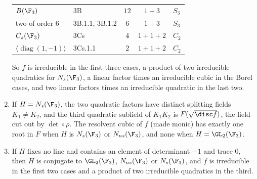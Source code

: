 \begin{proposition}
\begin{enumerate}[label=(\alph*)]
\begin{center}
\begin{tabular}{llccl}
$B(\F_3)$ & 3B & $12$ & $1+3$ & $S_3$\\
two of order $6$ & 3B.1.1, 3B.1.2 & $6$ & $1+3$ & $S_3$\\
$C_s(\F_3)$ & 3Cs & $4$ & $1+1+2$ & $C_2$\\
$\langle\operatorname{diag}(1,-1)\rangle$ & 3Cs.1.1 & $2$ & $1+1+2$ & $C_2$\\
\bottomrule
\end{tabular}
\end{center}
So $f$ is irreducible in the first three cases, a product of two irreducible quadratics for $N_s(\F_3)$, a linear factor times an irreducible cubic in the
Borel cases, and two linear factors times an irreducible quadratic in the last two.
\item If $H=N_s(\F_3)$, the two quadratic factors have distinct splitting fields $K_1\ne K_2$, and the third quadratic subfield of $K_1K_2$ is $F(\sqrt{\disc f})$, the
field cut out by $\det\circ\rho$. The resolvent cubic of $f$ (made monic) has exactly one root in $F$ when $H$ is $N_s(\F_3)$ or $N_{ns}(\F_3)$, and none when
$H=\GL_2(\F_3)$.
\item If $H$ fixes no line and contains an element of determinant $-1$ and trace $0$, then $H$ is conjugate to $\GL_2(\F_3)$, $N_{ns}(\F_3)$ or $N_s(\F_3)$, and $f$ is
irreducible in the first two cases and a product of two irreducible quadratics in the third.
\end{enumerate}
\end{proposition}

